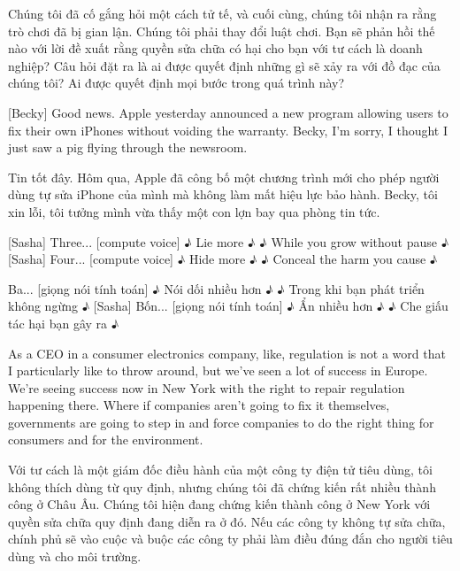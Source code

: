 \documentclass[a4paper]{article}
\begin{document}
	\begin{vietnamese-v2}
		Chúng tôi đã cố gắng hỏi một cách tử tế, và cuối cùng, chúng tôi nhận ra rằng trò chơi đã bị gian lận.
		Chúng tôi phải thay đổi luật chơi.
		Bạn sẽ phản hồi thế nào với lời đề xuất rằng quyền sửa chữa có hại cho bạn với tư cách là doanh nghiệp?
		Câu hỏi đặt ra là ai được quyết định những gì sẽ xảy ra với đồ đạc của chúng tôi?
		Ai được quyết định mọi bước trong quá trình này?
	\end{vietnamese-v2}
	
	[Becky] Good news.
	Apple yesterday announced a new program allowing users to fix their own iPhones without voiding the warranty.
	Becky, I'm sorry, I thought I just saw a pig flying through the newsroom.
	
	\begin{vietnamese-v2}
		[Becky] Tin tốt đây.
		Hôm qua, Apple đã công bố một chương trình mới cho phép người dùng tự sửa iPhone của mình mà không làm mất hiệu lực bảo hành.
		Becky, tôi xin lỗi, tôi tưởng mình vừa thấy một con lợn bay qua phòng tin tức.
	\end{vietnamese-v2}
	
	
	[Sasha] Three...
	[compute voice] ♪ Lie more ♪
	♪ While you grow without pause ♪
	[Sasha] Four...
	[compute voice] ♪ Hide more ♪
	♪ Conceal the harm you cause ♪
	
	\begin{vietnamese-v2}
		[Sasha] Ba...
		[giọng nói tính toán] ♪ Nói dối nhiều hơn ♪
		♪ Trong khi bạn phát triển không ngừng ♪
		[Sasha] Bốn...
		[giọng nói tính toán] ♪ Ẩn nhiều hơn ♪
		♪ Che giấu tác hại bạn gây ra ♪
	\end{vietnamese-v2}
	
	As a CEO in a consumer electronics company, like, regulation is not a word that I particularly like to throw around, but we've seen a lot of success in Europe.
	We're seeing success now in New York with the right to repair regulation happening there.
	Where if companies aren't going to fix it themselves, governments are going to step in and force companies to do the right thing for consumers and for the environment.
	
	\begin{vietnamese-v2}
		Với tư cách là một giám đốc điều hành của một công ty điện tử tiêu dùng, tôi không thích dùng từ quy định, nhưng chúng tôi đã chứng kiến rất nhiều thành công ở Châu Âu.
		Chúng tôi hiện đang chứng kiến thành công ở New York với quyền sửa chữa quy định đang diễn ra ở đó.
		Nếu các công ty không tự sửa chữa, chính phủ sẽ vào cuộc và buộc các công ty phải làm điều đúng đắn cho người tiêu dùng và cho môi trường.
	\end{vietnamese-v2}
	
\end{document}

